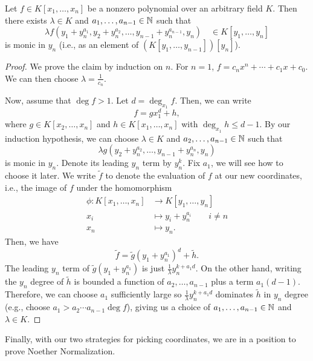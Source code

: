 \documentclass[12pt]{article}
\begin{document}
\begin{lem} \label{newcoordsfin}
    Let $f\in K[x_1,\dots,x_n]$ be a nonzero polynomial over an arbitrary field $K$. Then there exists $\lambda\in K$ and $a_1,\dots,a_{n-1}\in \mathbb{N}$ such that
    \[\lambda f(y_1+ y_n^{a_1}, y_2 + y_n^{a_2}, \dots, y_{n-1} + y_n^{a_{n-1}}, y_n) \quad \in K[y_1,\dots,y_n]\]
    is monic in $y_n$ (i.e., as an element of $(K[y_1,\dots,y_{n-1}])[y_n]$).
\end{lem}

\begin{proof}
    We prove the claim by induction on $n$. For $n=1$, $f=c_n x^n + \cdots + c_1 x + c_0$. We can then choose $\lambda = \frac{1}{c_n}$.
    
    Now, assume that $\deg f > 1$. Let $d=\deg_{x_1} f$. Then, we can write
    \[f = gx_1^d + h,\]
    where $g\in K[x_2,\dots,x_n]$ and $h\in K[x_1,\dots,x_n]$ with $\deg_{x_1} h \leq d-1$. By our induction hypothesis, we can choose $\lambda \in K$ and $a_2,\dots,a_{n-1}\in \mathbb{N}$ such that
    \[\lambda g(y_2+y_n^{a_2},\dots,y_{n-1}+y_n^{a_n}, y_n)\]
    is monic in $y_n$. Denote its leading $y_n$ term by $y_n^k$. Fix $a_1$, we will see how to choose it later. We write $\tilde{f}$ to denote the evaluation of $f$ at our new coordinates, i.e., the image of $f$ under the homomorphism
    \begin{align*}
        \phi: K[x_1,\dots,x_n] &\longrightarrow K[y_1,\dots,y_n]\\
        x_i &\longmapsto y_i + y_n^{a_i} \qquad i\neq n\\
        x_n &\longmapsto y_n.
    \end{align*}
    Then, we have
    \[\tilde{f} = \tilde{g}(y_1+y_n^{a_1})^d + \tilde{h}.\]
    The leading $y_n$ term of $\tilde{g}(y_1+y_n^{a_1})$ is just $\frac{1}{\lambda} y_n^{k+a_1 d}$. On the other hand, writing the $y_n$ degree of $\tilde{h}$ is bounded a function of $a_2,\dots,a_{n-1}$ plus a term $a_1 (d-1)$. Therefore, we can choose $a_1$ sufficiently large so $\frac{1}{\lambda} y_n^{k+a_1 d}$ dominates $\tilde{h}$ in $y_n$ degree (e.g., choose $a_1> a_2\cdots a_{n-1}\deg f$), giving us a choice of $a_1,\dots,a_{n-1}\in \mathbb{N}$ and $\lambda\in K$.
\end{proof}

Finally, with our two strategies for picking coordinates, we are in a position to prove Noether Normalization.
\end{document}
